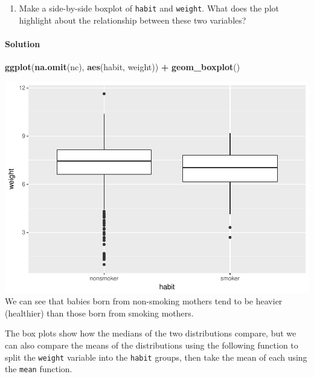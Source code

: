 \documentclass[]{article}
\newenvironment{Shaded}{\begin{snugshade}}{\end{snugshade}}
\newcommand{\KeywordTok}[1]{\textcolor[rgb]{0.13,0.29,0.53}{\textbf{#1}}}
\newcommand{\StringTok}[1]{\textcolor[rgb]{0.31,0.60,0.02}{#1}}
\newcommand{\OperatorTok}[1]{\textcolor[rgb]{0.81,0.36,0.00}{\textbf{#1}}}
\newcommand{\NormalTok}[1]{#1}
\providecommand{\tightlist}{%
  \setlength{\itemsep}{0pt}\setlength{\parskip}{0pt}}
\let\oldparagraph\paragraph
\renewcommand{\paragraph}[1]{\oldparagraph{#1}\mbox{}}
\begin{document}
\begin{enumerate}
\def\labelenumi{\arabic{enumi}.}
\setcounter{enumi}{1}
\tightlist
\item
  Make a side-by-side boxplot of \texttt{habit} and \texttt{weight}.
  What does the plot highlight about the relationship between these two
  variables?
\end{enumerate}

\paragraph{Solution}\label{solution-1}

\begin{Shaded}
\begin{Highlighting}[]
\KeywordTok{ggplot}\NormalTok{(}\KeywordTok{na.omit}\NormalTok{(nc), }\KeywordTok{aes}\NormalTok{(habit, weight)) }\OperatorTok{+}
\StringTok{  }\KeywordTok{geom_boxplot}\NormalTok{()}
\end{Highlighting}
\end{Shaded}

\includegraphics{DATA_606_Lab_5_files/figure-latex/unnamed-chunk-3-1.pdf}
We can see that babies born from non-smoking mothers tend to be heavier
(healthier) than those born from smoking mothers.

The box plots show how the medians of the two distributions compare, but
we can also compare the means of the distributions using the following
function to split the \texttt{weight} variable into the \texttt{habit}
groups, then take the mean of each using the \texttt{mean} function.

\begin{Shaded}
\end{Shaded}
\end{document}
